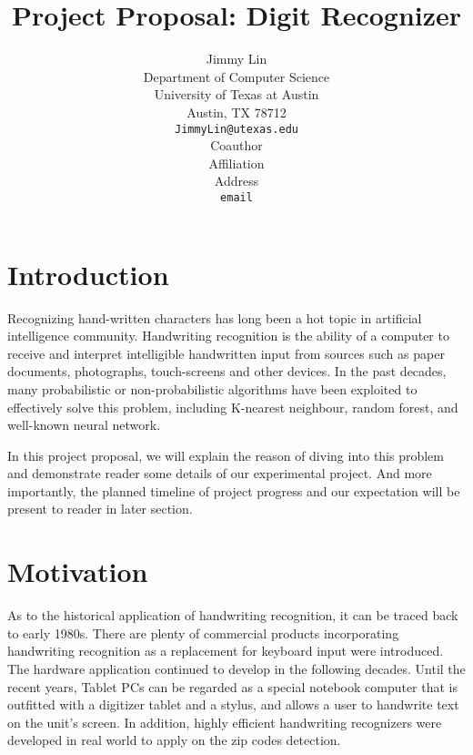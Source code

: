 \documentclass{article} %
\title{Project Proposal: Digit Recognizer}
\author{
Jimmy Lin  \\
Department of Computer Science\\
University of Texas at Austin\\
Austin, TX 78712 \\
\texttt{JimmyLin@utexas.edu} \\
\And
Coauthor \\
Affiliation \\
Address \\
\texttt{email} \\
}
\begin{document}
\maketitle

%    


\section{Introduction}
Recognizing hand-written characters has long been a hot topic in artificial
intelligence community. 
Handwriting recognition is the ability of a computer to receive and
interpret intelligible handwritten input from sources such as paper documents,
photographs, touch-screens and other devices.
In the past decades, many probabilistic or non-probabilistic algorithms have been exploited to
effectively solve this problem, including K-nearest neighbour,
random forest, and well-known neural network. 

In this project proposal, we will explain the reason of diving into this
problem and demonstrate reader some details of our experimental project.
And more importantly, the planned timeline of project progress and our
expectation will be present to reader in later section.

\section{Motivation}

As to the historical application of handwriting recognition, 
it can be traced back to early 1980s.  There are plenty of commercial products
incorporating handwriting recognition as a replacement for keyboard input were
introduced. The hardware application continued to develop
in the following decades.  Until the recent years, Tablet PCs can be regarded
as a special notebook computer that is outfitted with a digitizer tablet and a
stylus, and allows a user to handwrite text on the unit's screen. In addition,
highly efficient handwriting recognizers were developed in real world to apply
on the zip codes detection.
\end{document}
